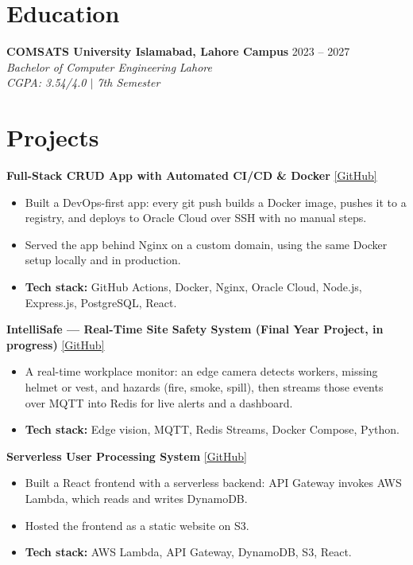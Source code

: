 \documentclass[a4paper,10.5pt]{article}
\newcommand{\entrytitle}[2]{%
  \textbf{#1} \hfill #2%
}
\begin{document}
\section{Education}

\entrytitle{COMSATS University Islamabad, Lahore Campus}{2023 -- 2027} \\
\textit{Bachelor of Computer Engineering} \hfill \textit{Lahore} \\
\textit{CGPA: 3.54/4.0 $|$ 7th Semester}

\section{Projects}

\textbf{Full-Stack CRUD App with Automated CI/CD \& Docker} \hfill
{\small \href{https://github.com/Muhammad-Ahmad17/root}{[GitHub]}}
\begin{itemize}[nosep, leftmargin=1.5em, topsep=2pt]
  \item Built a DevOps-first app: every git push builds a Docker image, pushes it to a registry, and deploys to Oracle Cloud over SSH with no manual steps.
  \item Served the app behind Nginx on a custom domain, using the same Docker setup locally and in production.
  \item \textbf{Tech stack:} GitHub Actions, Docker, Nginx, Oracle Cloud, Node.js, Express.js, PostgreSQL, React.
\end{itemize}

\vspace{0.08cm}

\textbf{IntelliSafe --- Real-Time Site Safety System (Final Year Project, in progress)} \hfill
{\small \href{https://github.com/Muhammad-Ahmad17/fyp}{[GitHub]}}
\begin{itemize}[nosep, leftmargin=1.5em, topsep=2pt]
  \item A real-time workplace monitor: an edge camera detects workers, missing helmet or vest, and hazards (fire, smoke, spill), then streams those events over MQTT into Redis for live alerts and a dashboard.
  \item \textbf{Tech stack:} Edge vision, MQTT, Redis Streams, Docker Compose, Python.
\end{itemize}

\vspace{0.08cm}

\textbf{Serverless User Processing System} \hfill
{\small \href{https://github.com/Muhammad-Ahmad17/getApiForUserData}{[GitHub]}}
\begin{itemize}[nosep, leftmargin=1.5em, topsep=2pt]
  \item Built a React frontend with a serverless backend: API Gateway invokes AWS Lambda, which reads and writes DynamoDB.
  \item Hosted the frontend as a static website on S3.
  \item \textbf{Tech stack:} AWS Lambda, API Gateway, DynamoDB, S3, React.
\end{itemize}
\end{document}
